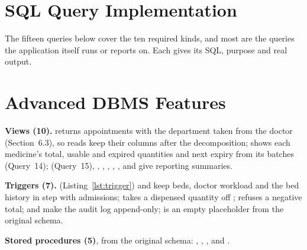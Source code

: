 \section{SQL Query Implementation}
The fifteen queries below cover the ten required kinds, and most are the queries the application itself runs or
reports on. Each gives its SQL, purpose and real output.


\section{Advanced DBMS Features}
\textbf{Views (10).}  returns appointments with the department taken from the doctor
(Section~6.3), so reads keep their columns after the decomposition;  shows each medicine's
total, usable and expired quantities and next expiry from its batches (Query~14); 
(Query~15), , , ,
, ,  and
 give reporting summaries.

\textbf{Triggers (7).}  (Listing~\ref{lst:trigger}) and 
keep beds, doctor workload and the bed history in step with admissions;
 takes a dispensed quantity off ;
 refuses a negative total;  and
 make the audit log append-only;  is an empty
placeholder from the original schema.


\textbf{Stored procedures (5)}, from the original schema: , ,
,  and .


